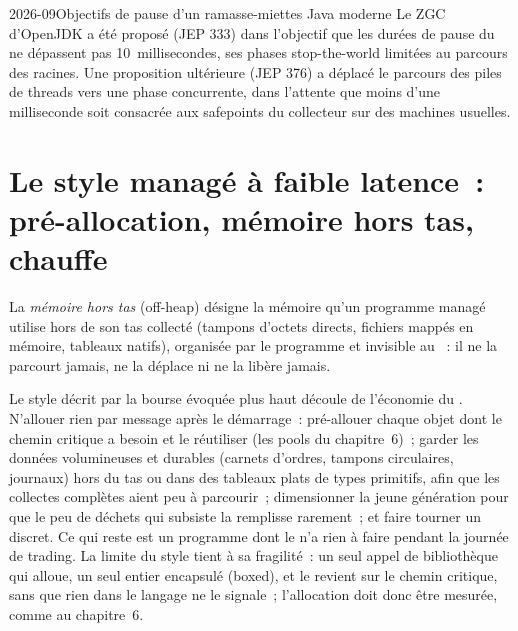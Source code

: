 \begin{dated}{2026-09}{Objectifs de pause d'un ramasse-miettes Java moderne}\label{dat:ll:managed-and-functional-languages-on-the-desk:jvm}
Le ZGC d'OpenJDK a été proposé (JEP 333) dans l'objectif que les durées de pause du  ne dépassent pas 10~millisecondes,
ses phases stop-the-world limitées au parcours des racines. Une proposition ultérieure (JEP 376) a déplacé le parcours des piles de threads
vers une phase concurrente, dans l'attente que moins d'une milliseconde soit consacrée aux safepoints du collecteur
sur des machines usuelles.
\end{dated}

\section{Le style managé à faible latence~: pré-allocation, mémoire hors tas, chauffe}

\begin{definition}\label{def:ll:managed-and-functional-languages-on-the-desk:offheap}
La \emph{mémoire hors tas} (off-heap) désigne la mémoire qu'un programme managé utilise hors de son tas collecté (tampons d'octets
directs, fichiers mappés en mémoire, tableaux natifs), organisée par le programme et invisible au ~: il ne la parcourt jamais,
ne la déplace ni ne la libère jamais.
\end{definition}

Le style décrit par la bourse évoquée plus haut découle de l'économie du . N'allouer rien par message après
le démarrage~: pré-allouer chaque objet dont le chemin critique a besoin et le réutiliser (les pools du chapitre~6)~; garder les données volumineuses et durables
(carnets d'ordres, tampons circulaires, journaux) hors du tas ou dans des tableaux plats de types primitifs, afin que les collectes complètes aient peu à parcourir~;
dimensionner la jeune génération pour que le peu de déchets qui subsiste la remplisse rarement~; et faire tourner un  discret. Ce qui reste
est un programme dont le  n'a rien à faire pendant la journée de trading. La limite du style tient à sa fragilité~:
un seul appel de bibliothèque qui alloue, un seul entier encapsulé (boxed), et le  revient sur le chemin critique, sans que rien dans le langage ne le signale~;
l'allocation doit donc être mesurée, comme au chapitre~6.

